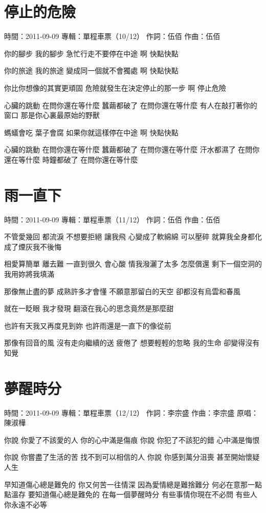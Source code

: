 \documentclass[UTF8,a4paper,oneside,twocolumn,12pt]{ctexbook}
\newcommand{\infopair}[2]{\textbullet #1：#2}
\newcommand{\zc}[1][伍佰]{\infopair{作詞}{#1}}
\newcommand{\zq}[1][伍佰]{\infopair{作曲}{#1}}
\newcommand{\zj}[1]{\infopair{專輯}{#1}}
\newcommand{\yc}[1]{\infopair{原唱}{#1}}
\newcommand{\sj}[1]{\infopair{時間}{#1}}
\newenvironment{info}{\begin{flushleft}\kaishu
	}
	{\end{flushleft}\normalsize\yahei\par}
\newenvironment{lyric}{
	}
{}
\begin{document}
\section{停止的危險}
\begin{info}
	\sj{2011-09-09}
	\zj{單程車票（10/12）}
	\zc
	\zq
\end{info}
\begin{lyric}
	你的腳步 我的腳步
	急忙行走不要停在中途
	啊 快點快點

	你的旅途 我的旅途
	變成同一個就不會獨處
	啊 快點快點

	你比你想像的其實更頑固
	危險就發生在決定停止的那一步
	啊 停止危險

	心臟的跳動 在問你還在等什麼
	蠶繭都破了 在問你還在等什麼
	有人在敲打著你的窗口
	那是你心裏最原始的野獸

	螞蟻會吃 葉子會腐
	如果你就這樣停在中途
	啊 快點快點

	心臟的跳動 在問你還在等什麼
	蠶繭都破了 在問你還在等什麼
	汗水都濕了 在問你還在等什麼
	時鐘都破了 在問你還在等什麼
\end{lyric}

\section{雨一直下}
\begin{info}
	\sj{2011-09-09}
	\zj{單程車票（11/12）}
	\zc
	\zq
\end{info}
\begin{lyric}
	不管愛幾回 都流淚
	不想要拒絕 讓我飛
	心變成了軟綿綿 可以壓碎
	就算我全身都化成了煙灰我不後悔

	相愛算簡單 離去難
	一直到很久 會心酸
	情我潑灑了太多 怎麼償還
	剩下一個空洞的我用妳將我填滿

	那像無止盡的夢
	成熟許多才會懂
	不願意那留白的天空
	卻都沒有烏雲和春風

	就在一眨眼 我才發現
	翻滾在我心的思念竟然是那麼甜

	也許有天我又再度見到妳
	也許雨還是一直下的像從前

	那像有回音的風
	沒有走向繼續的送
	疲倦了 想要輕輕的忽略
	我的生命 卻變得沒有知覺
\end{lyric}

\section{夢醒時分}
\begin{info}
	\sj{2011-09-09}
	\zj{單程車票（12/12）}
	\zc[李宗盛]
	\zq[李宗盛]
	\yc{陳淑樺}
\end{info}
\begin{lyric}
	你說 你愛了不該愛的人 你的心中滿是傷痕
	你說 你犯了不該犯的錯 心中滿是悔恨

	你說 你嘗盡了生活的苦 找不到可以相信的人
	你說 你感到萬分沮喪 甚至開始懷疑人生

	早知道傷心總是難免的 你又何苦一往情深
	因為愛情總是難捨難分 何必在意那一點點溫存
	要知道傷心總是難免的 在每一個夢醒時分
	有些事情你現在不必問 有些人你永遠不必等
\end{lyric}
\end{document}
